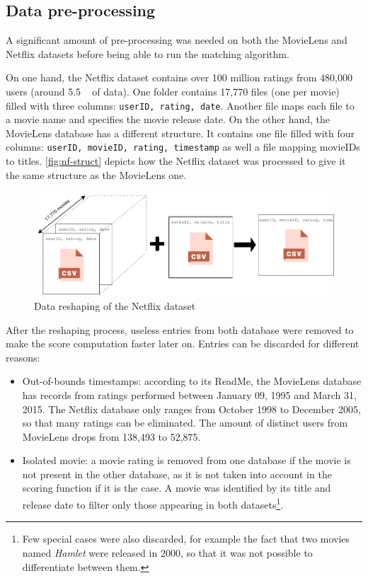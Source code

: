 \subsection{Data pre-processing}

A significant amount of pre-processing was needed on both the MovieLens and Netflix datasets before being able to run the matching algorithm. 

On one hand, the Netflix dataset contains over 100 million ratings from 480,000 users (around 5.5 \si{\giga\byte} of data). One folder contains 17,770 files (one per movie) filled with three columns: \texttt{userID, rating, date}. Another file maps each file to a movie name and specifies the movie release date. On the other hand, the MovieLens database has a different structure. It contains one file filled with four columns: \texttt{userID, movieID, rating, timestamp} as well a file mapping movieIDs to titles. \autoref{fig:nf-struct} depicts how the Netflix dataset was processed to give it the same structure as the MovieLens one.

\begin{figure}[h]
	\centering
	\includegraphics[width=.9\linewidth]{img/processing.pdf}
	\caption{Data reshaping of the Netflix dataset}
	\label{fig:nf-struct}
\end{figure}

After the reshaping process, useless entries from both database were removed to make the score computation faster later on. Entries can be discarded for different reasons:

\begin{itemize}
	\item Out-of-bounds timestamps: according to its ReadMe, the MovieLens database has records from ratings performed between January 09, 1995 and March 31, 2015. The Netflix database only ranges from October 1998 to December 2005, so that many ratings can be eliminated. The amount of distinct users from MovieLens drops from 138,493 to 52,875.
	
	\item Isolated movie: a movie rating is removed from one database if the movie is not present in the other database, as it is not taken into account in the scoring function if it is the case. A movie was identified by its title and release date to filter only those appearing in both datasets\footnote{Few special cases were also discarded, for example the fact that two movies named \textit{Hamlet} were released in 2000, so that it was not possible to differentiate between them.}.
\end{itemize}

